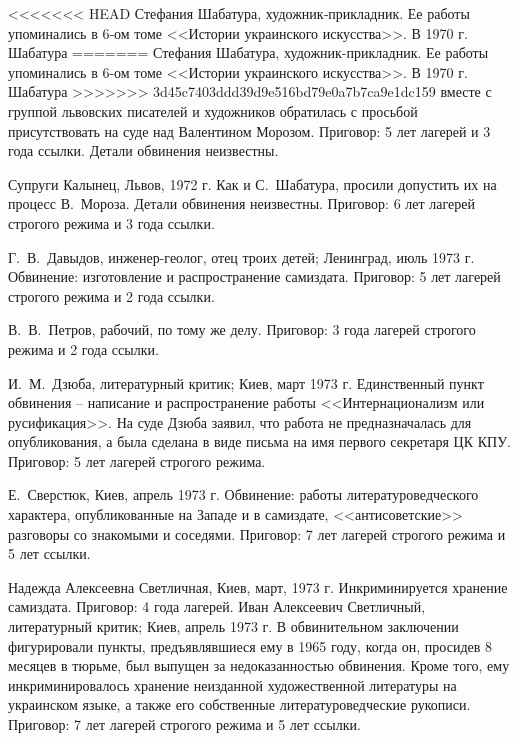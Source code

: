 \documentclass{book}
\begin{document}
<<<<<<< HEAD
Стефания Шабатура, художник‑прикладник. Ее работы упоминались в 6‑ом томе <<Истории украинского искусства>>. В 1970 г. Шабатура 
=======
Стефания Шабатура, художник-прикладник. Ее работы упоминались в 6-ом томе <<Истории украинского искусства>>. В 1970 г. Шабатура 
>>>>>>> 3d45c7403ddd39d9e516bd79e0a7b7ca9e1dc159
вместе с группой львовских писателей и художников обратилась с просьбой присутствовать на суде над Валентином Морозом. Приговор: 
5 лет лагерей и 3 года ссылки. Детали об­винения неизвестны.

Супруги Калынец, Львов, 1972 г. Как и С.~Шабатура, просили допустить их на процесс В.~Мороза. Детали обвинения неиз­вестны. 
Приговор: 6 лет лагерей строгого режима и 3 года ссылки.

Г.~В.~Давыдов, инженер-геолог, отец троих детей; Ленинград, июль 1973 г. Обвинение: изготовление и распространение самиздата. 
Приговор: 5 лет лагерей строгого режима и 2 года ссылки.

В.~В.~Петров, рабочий, по тому же делу. Приговор: 3 года лагерей строгого режима и 2 года ссылки.

И.~М.~Дзюба, литературный критик; Киев, март 1973 г. Единственный пункт обвинения -- написание и распространение ра­боты 
<<Интернационализм или русификация>>. На суде Дзюба заявил, что работа не предназначалась для опубликования, а была сделана в виде 
письма на имя первого секретаря ЦК КПУ. Приговор: 5 лет лагерей строгого режима.

Е.~Сверстюк, Киев, апрель 1973 г. Обвинение: работы литературоведческого характера, опубликованные на Западе и в самиздате, 
<<антисоветские>> разговоры со знакомыми и сосе­дями. Приговор: 7 лет лагерей строгого режима и 5 лет ссылки.

Надежда Алексеевна Светличная, Киев, март, 1973 г. Инкриминируется хранение самиздата. Приговор: 4 года лагерей.
Иван Алексеевич Светличный, литературный критик; Киев, апрель 1973 г. В обвинительном заключении фигурировали пункты, 
предъявлявшиеся ему в 1965 году, когда он, просидев 8 месяцев в тюрьме, был выпущен за недоказанностью обвинения. Кроме того, 
ему инкриминировалось хранение неизданной художественной литературы на украинском языке, а также его собственные 
литературоведческие рукописи. Приговор: 7 лет лагерей строгого режима и 5 лет ссылки.
\end{document}
